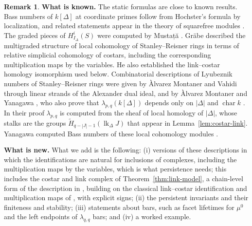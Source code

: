 \documentclass[11pt]{article}
\theoremstyle{plain}
\theoremstyle{definition}
\newtheorem{remark}[theorem]{Remark}
\newcommand{\kk}{k}
\newcommand{\link}{\operatorname{lk}}
\newcommand{\rH}{\widetilde{H}}
\newcommand{\Hloc}[2]{H^{#1}_{#2}}
\begin{document}
\begin{remark}

\textbf{What is known.} The static formulas are close to known results. Bass numbers of $\kk[\Delta]$
at coordinate primes follow from Hochster's formula \cite{Hochster} by localization, and related statements
appear in the theory of squarefree modules \cite{Yanagawa2000,MillerSturmfels}. The graded pieces of
$\Hloc{i}{I_\Delta}(S)$ were computed by Mustață \cite{Mustata}. Gr\"abe \cite{Grabe1984} described the multigraded structure of local cohomology of Stanley--Reisner rings in terms of relative simplicial cohomology of costars, including the corresponding multiplication maps by the variables. He also established the link--costar homology isomorphism used below. Combinatorial descriptions of Lyubeznik numbers of Stanley--Reisner rings were given by Àlvarez Montaner and Vahidi \cite{AlvarezMontanerVahidi} through linear strands of the Alexander dual ideal, and by Àlvarez Montaner and Yanagawa \cite{AlvarezMontanerYanagawa}, who also prove that $\lambda_{p,q}(\kk[\Delta])$ depends only on $|\Delta|$ and $\operatorname{char}\kk$ \cite[Theorem~5.3]{AlvarezMontanerYanagawa}. In their proof $\lambda_{p,q}$ is computed from the sheaf of local homology of $|\Delta|$, whose stalks are the groups $\rH_{q-|J|-1}(\link_\Delta J)$ that appear in Lemma~\ref{lem:costar-link}. Yanagawa computed Bass numbers of these local cohomology modules
\cite{Yanagawa2001}.

\medskip\noindent
\textbf{What is new.} What we add is the following: (i) versions of these descriptions in which the identifications are natural for inclusions of complexes, including the multiplication maps by the variables, which is what persistence needs; this includes the costar and link complex of Theorem~\ref{thm:link-model}, a chain-level form of the description in \cite{AlvarezMontanerYanagawa}, building on the classical link--costar identification and multiplication maps of \cite{Grabe1984}, with explicit signs; (ii) the persistent invariants and their finiteness and stability;  (iii) statements about bars, such as facet lifetimes for $\mu^0$ and the left endpoints of $\lambda_{q,q}$ bars; and (iv) a worked example.




\medskip\noindent


\end{remark}
\end{document}
